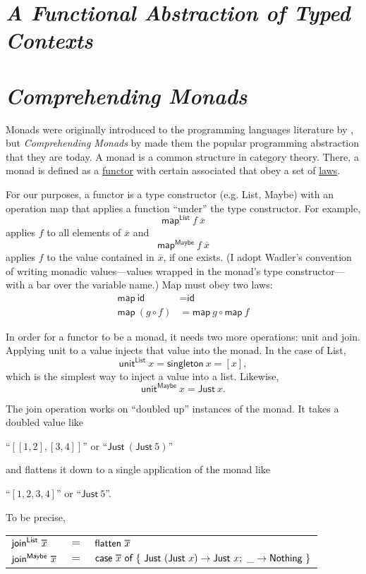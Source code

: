 \documentclass[acmsmall, nonacm, screen]{acmart}
\newcommand\doverline[1]{%
  \setbox0=\hbox{$\overline{#1}$}%
  \ht0=\dimexpr\ht0-.30ex\relax%
  \overline{\copy0}%
}
\newcommand{\map}[3]{\textsf{map}^{\textsf{#1}}~#2~#3}
\newcommand{\unit}[2]{\textsf{unit}^{\textsf{#1}}~#2}
\newcommand{\join}[2]{\textsf{join}^{\textsf{#1}}~#2}
\begin{document}
\section{{\em A Functional Abstraction of Typed Contexts}} \label{sec:danvy}

\section{{\em Comprehending Monads}} \label{sec:wadler}

Monads were originally introduced to the programming languages literature by
\citet{moggi1991notions}, but {\em Comprehending Monads} by \citet{wadler1990comprehending} made
them the popular programming abstraction that they are today. A monad is a common structure in
category theory. There, a monad is defined as a \underline{functor} with certain associated
\underline{} that obey a set of \underline{laws}.

For our purposes, a functor is a type constructor (e.g. \textsf{List}, \textsf{Maybe}) with an
operation \textsf{map} that applies a function ``under'' the type constructor. For example,
\[ \map{List}{f}{\overline{x}} \]
applies $f$ to all elements of $\overline{x}$ and 
\[ \map{Maybe}{f}{\overline{x}} \]
applies $f$ to the value contained in $\overline{x}$, if one exists. (I adopt Wadler's convention
of writing monadic values---values wrapped in the monad's type constructor---with a bar over the
variable name.) Map must obey two laws:
\begin{align*}
  \textsf{map}~\textsf{id} &= \textsf{id} \\
  \textsf{map}~(g \circ f) &= \textsf{map}~g \circ \textsf{map}~f
\end{align*}

In order for a functor to be a monad, it needs two more operations: \textsf{unit} and \textsf{join}.
Applying \textsf{unit} to a value injects that value into the monad. In the case of \textsf{List},
\[ \unit{List}{x} = \textsf{singleton}~x = [x], \]
which is the simplest way to inject a value into a list. Likewise,
\[ \unit{Maybe}{x} = \textsf{Just}~x. \]

The \textsf{join} operation works on ``doubled up'' instances of the monad. It takes a doubled
value like
\begin{center}
  ``$[[1, 2], [3, 4]]$'' or ``$\textsf{Just}~(\textsf{Just}~5)$''
\end{center}
and flattens it down to a single application of the monad like
\begin{center}
  ``$[1, 2, 3, 4]$'' or ``$\textsf{Just}~5$''.
\end{center}
To be precise,
\begin{center}
  \begin{tabular}{lll}
    $\join{List}{\doverline{x}}$ & $=$ & $\textsf{flatten}~\doverline{x}$ \\
    $\join{Maybe}{\doverline{x}}$ & $=$ & $\textsf{case}~\doverline{x}~\textsf{of}~\{~\textsf{Just}~(\textsf{Just}~x) \to \textsf{Just}~x;\ \_ \to \textsf{Nothing}~\}$
  \end{tabular}
\end{center}
\end{document}
